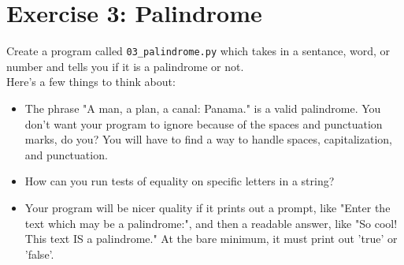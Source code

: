 \documentclass{42-en}
\begin{document}
\nextexercice
\newpage


\chapter{Exercise 3: Palindrome}
\makeheaderfiles

Create a program called \texttt{03\_palindrome.py} which takes in a sentance, word, or number and tells you if it is a palindrome or not.
\\
Here's a few things to think about:
\begin{itemize}
	\item The phrase "A man, a plan, a canal: Panama." is a valid palindrome. You don't want your program to ignore because of the spaces and punctuation marks, do you? You will have to find a way to handle spaces, capitalization, and punctuation.
	\item How can you run tests of equality on specific letters in a string?
	\item Your program will be nicer quality if it prints out a prompt, like "Enter the text which may be a palindrome:", and then a readable answer, like "So cool! This text IS a palindrome." At the bare minimum, it must print out 'true' or 'false'.
\end{itemize}
\end{document}
